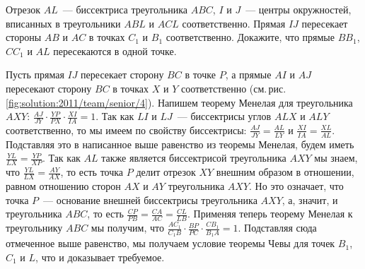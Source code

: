 \problem{}
Отрезок $AL$~--- биссектриса треугольника $ABC$, $I$ и $J$~--- центры
окружностей, вписанных в треугольники $ABL$ и $ACL$ соответственно.
Прямая $IJ$ пересекает стороны $AB$ и $AC$ в точках $C_1$ и $B_1$
соответственно.
Докажите, что прямые $B B_1$, $C C_1$ и $AL$ пересекаются в одной точке.

%
\label{solution:2011/team/senior/4}%
Пусть прямая $IJ$ пересекает сторону $BC$ в точке $P$, а прямые $AI$ и $AJ$
пересекают сторону $BC$ в точках $X$ и $Y$ соответственно
(см.\,рис.\,\ref{fig:solution:2011/team/senior/4}).
Напишем теорему Менелая для треугольника $AXY$:
\(
    \frac{AJ}{JY}
    \cdot
    \frac{YP}{PX}
    \cdot
    \frac{XI}{IA}
=
    1
\).
Так как $LI$ и $LJ$~--- биссектрисы углов $ALX$ и $ALY$ соответственно, то мы
имеем по свойству биссектрисы:
$\frac{AJ}{JY} = \frac{AL}{LY}$ и $\frac{XI}{IA} = \frac{XL}{AL}$.
Подставляя это в написанное выше равенство из теоремы Менелая, будем иметь
$\frac{YL}{LX} = \frac{YP}{XP}$.
Так как $AL$ также является биссектрисой треугольника $AXY$ мы знаем, что
$\frac{YL}{LX} = \frac{AY}{AX}$, то есть точка $P$ делит отрезок $XY$ внешним
образом в отношении, равном отношению сторон $AX$ и $AY$ треугольника $AXY$.
Но это означает, что точка $P$~--- основание внешней биссектрисы треугольника
$AXY$, а, значит, и треугольника $ABC$, то есть
$\frac{CP}{PB} = \frac{CA}{AC} = \frac{CL}{LB}$.
Применяя теперь теорему Менелая к треугольнику $ABC$ мы получим, что
\(
    \frac{A C_1}{C_1 B}
    \cdot
    \frac{BP}{PC}
    \cdot
    \frac{C B_1}{B_1 A}
=
    1
\).
Подставляя сюда отмеченное выше равенство, мы получаем условие теоремы Чевы для
точек $B_1$, $C_1$ и $L$, что и доказывает требуемое.

\endproblem
